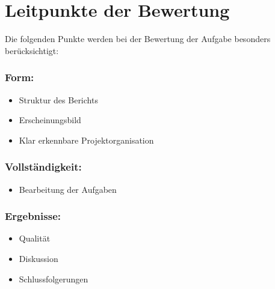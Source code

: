 \section{Leitpunkte der Bewertung}
Die folgenden Punkte werden bei der Bewertung der Aufgabe besonders berücksichtigt:

\subsubsection*{Form:}
\begin{itemize}
\item Struktur des Berichts
\item Erscheinungsbild
\item Klar erkennbare Projektorganisation
\end{itemize}

\subsubsection*{Vollständigkeit:}
\begin{itemize}
\item Bearbeitung der Aufgaben
\end{itemize}

\subsubsection*{Ergebnisse:}
\begin{itemize}
\item Qualität
\item Diskussion
\item Schlussfolgerungen
\end{itemize}